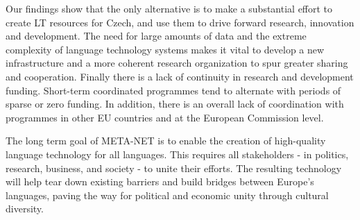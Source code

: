 \begin{multicols}{2}
Our findings show that the only alternative is to make a substantial effort to create LT resources for Czech, and use them to drive forward research, innovation and development. The need for large amounts of data and the extreme complexity of language technology systems makes it vital to develop a new infrastructure and a more coherent research organization to spur greater sharing and cooperation.
Finally there is a lack of continuity in research and development funding. Short-term coordinated programmes tend to alternate with periods of sparse or zero funding. In addition, there is an overall lack of coordination with programmes in other EU countries and at the European Commission level.

The long term goal of META-NET is to enable the creation of high-quality language technology for all languages. This requires all stakeholders - in politics, research, business, and society - to unite their efforts. The resulting technology will help tear down existing barriers and build bridges between Europe’s languages, paving the way for political and economic unity through cultural diversity.
\end{multicols}

\clearpage

